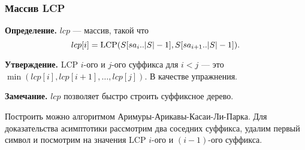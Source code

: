 \subsubsection{Массив LCP}
\textbf{Определение.} $lcp$ --- массив, такой что 
\[
    lcp[i] = \operatorname{LCP}(S[sa_i..|S|-1], S[sa_{i+1}..|S|-1]).
\]

\textbf{Утверждение.} LCP $i$-ого и $j$-ого суффикса для $i < j$ --- это\\ $\min(lcp[i], lcp[i + 1], \dots, lcp[j])$.
В качестве упражнения.

\textbf{Замечание.} $lcp$ позволяет быстро строить суффиксное дерево.

Построить можно алгоритмом Аримуры-Арикавы-Касаи-Ли-Парка.
Для доказательства асимптотики рассмотрим два соседних суффикса, удалим первый символ и посмотрим на значения LCP $i$-ого и $(i-1)$-ого суффикса.

